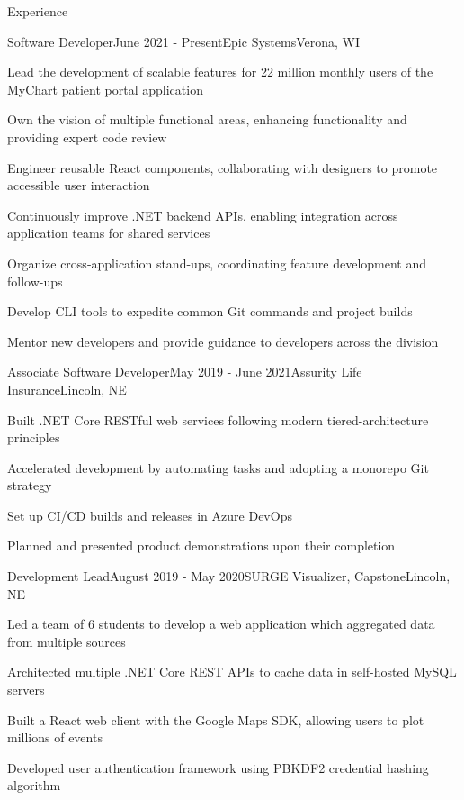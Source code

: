 \documentclass[
	10pt, %
]{article} %
\begin{document}
\begin{rSection}{Experience}

	\begin{rSubsection}{Software Developer}{June 2021 - Present}{Epic Systems}{Verona, WI}
		\item Lead the development of scalable features for 22 million monthly users of the MyChart patient portal application
		\item Own the vision of multiple functional areas, enhancing functionality and providing expert code review
		\item Engineer reusable React components, collaborating with designers to promote accessible user interaction
		\item Continuously improve .NET backend APIs, enabling integration across application teams for shared services
		\item Organize cross-application stand-ups, coordinating feature development and follow-ups
		\item Develop CLI tools to expedite common Git commands and project builds
		\item Mentor new developers and provide guidance to developers across the division
	\end{rSubsection}

	\begin{rSubsection}{Associate Software Developer}{May 2019 - June 2021}{Assurity Life Insurance}{Lincoln, NE}
		\item Built .NET Core RESTful web services following modern tiered-architecture principles
		\item Accelerated development by automating tasks and adopting a monorepo Git strategy
		\item Set up CI/CD builds and releases in Azure DevOps
		\item Planned and presented product demonstrations upon their completion
	\end{rSubsection}

	\begin{rSubsection}{Development Lead}{August 2019 - May 2020}{SURGE Visualizer, Capstone}{Lincoln, NE}
		\item Led a team of 6 students to develop a web application which aggregated data from multiple sources
		\item Architected multiple .NET Core REST APIs to cache data in self-hosted MySQL servers
		\item Built a React web client with the Google Maps SDK, allowing users to plot millions of events
		\item Developed user authentication framework using PBKDF2 credential hashing algorithm
	\end{rSubsection}


\end{rSection}
\end{document}
